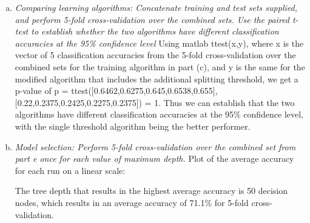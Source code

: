 \documentclass{article}
\begin{document}
\begin{enumerate}[(a)]
\item \emph{Comparing learning algorithms: Concatenate training and test sets supplied, and perform 5-fold cross-validation over the combined sets. Use the paired t-test to establish whether the two algorithms have different classification accuracies at the 95\% confidence level} Using matlab ttest(x,y), where x is the vector of 5 classification accuracies from the 5-fold cross-validation over the combined sets for the training algorithm in part (c), and y is the same for the modified algorithm that includes the additional splitting threshold, we get a p-value of p = ttest([0.6462,0.6275,0.645,0.6538,0.655],[0.22,0.2375,0.2425,0.2275,0.2375]) = 1. Thus we can establish that the two algorithms have different classification accuracies at the 95\% confidence level, with the single threshold algorithm being the better performer.
\item \emph{Model selection: Perform 5-fold cross-validation over the combined set from part e once for each value of maximum depth.}
Plot of the average accuracy for each run on a linear scale:


The tree depth that results in the highest average accuracy is 50 decision nodes, which results in an average accuracy of 71.1\% for 5-fold cross-validation.
\end{enumerate}
\end{document}
